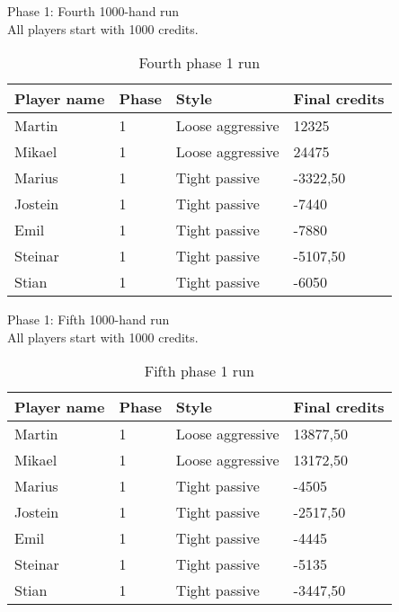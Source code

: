 \documentclass[a4paper, 12pt]{article}
\begin{document}
\begin{center}
	{ \Large Phase 1: Fourth 1000-hand run } \\
	All players start with 1000 credits.
\end{center}

\begin{table}[H]
	\begin{center}
		\begin{tabular}{|l|l|l| p{6cm} |}
		\hline
		\textbf{Player name} & \textbf{Phase} & \textbf{Style} & \textbf{Final credits} \\
		\hline
		Martin & 1 & Loose aggressive & 12325 \\
		\hline
		Mikael & 1 & Loose aggressive & 24475 \\
		\hline
		Marius & 1 & Tight passive & -3322,50 \\
		\hline
		Jostein & 1 & Tight passive & -7440 \\
		\hline
		Emil & 1 & Tight passive & -7880 \\
		\hline
		Steinar & 1 & Tight passive & -5107,50 \\
		\hline
		Stian & 1 & Tight passive & -6050 \\
		\hline
		\end{tabular}
	\end{center}
	\caption{Fourth phase 1 run}
\end{table}
\newpage
\begin{center}
	{ \Large Phase 1: Fifth 1000-hand run } \\
	All players start with 1000 credits.
\end{center}

\begin{table}[H]
	\begin{center}
		\begin{tabular}{|l|l|l| p{6cm} |}
		\hline
		\textbf{Player name} & \textbf{Phase} & \textbf{Style} & \textbf{Final credits} \\
		\hline
		Martin & 1 & Loose aggressive & 13877,50 \\
		\hline
		Mikael & 1 & Loose aggressive & 13172,50 \\
		\hline
		Marius & 1 & Tight passive & -4505 \\
		\hline
		Jostein & 1 & Tight passive & -2517,50 \\
		\hline
		Emil & 1 & Tight passive & -4445 \\
		\hline
		Steinar & 1 & Tight passive & -5135 \\
		\hline
		Stian & 1 & Tight passive & -3447,50 \\
		\hline
		\end{tabular}
	\end{center}
	\caption{Fifth phase 1 run}
\end{table}
\end{document}
